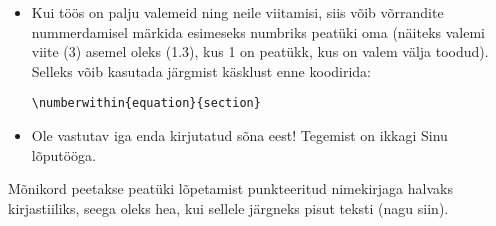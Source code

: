 \begin{itemize}
\item Kui töös on palju valemeid ning neile viitamisi, siis võib võrrandite nummerdamisel märkida esimeseks numbriks peatüki oma (näiteks valemi viite (3) asemel oleks (1.3), kus 1 on peatükk, kus on valem välja toodud). Selleks võib kasutada järgmist käsklust enne \verb__ koodirida:

\begin{verbatim}
\numberwithin{equation}{section}
\end{verbatim}
\item Ole vastutav iga enda kirjutatud sõna eest! Tegemist on ikkagi Sinu lõputööga.

\end{itemize}

Mõnikord peetakse peatüki lõpetamist punkteeritud nimekirjaga halvaks kirjastiiliks, seega oleks hea, kui sellele järgneks pisut teksti (nagu siin).